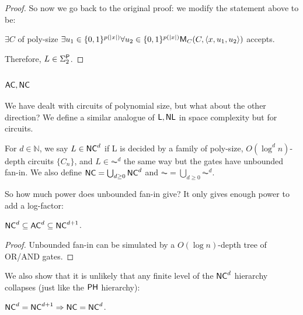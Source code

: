 \begin{proof}
\par So now we go back to the original proof: we modify the statement above to be:
\begin{center}
$\exists C$ of poly-size $\exists u_1 \in \{0, 1\}^{p(|x|)} \forall u_2 \in \{0, 1\}^{p(|x|)} \M_C(C, \langle x, u_1, u_2\rangle)$ accepts.
\end{center}
Therefore, $L \in \Sigma_2^\P$.
\end{proof}

\subsection{$\AC, \NC$}
We have dealt with circuits of polynomial size, but what about the other direction? We define a similar analogue of $\L, \NL$ in space complexity but for circuits.

\begin{definition}
For $d \in \mathbb{N}$, we say $L \in \NC^d$ if L is decided by a family of poly-size, $O(\log^d n)$-depth circuits $\{C_n\}$, and $L \in \AC^d$ the same way but the gates have unbounded fan-in. We also define $\NC = \bigcup_{d \ge 0}\NC^d$ and $\AC = \bigcup_{d \ge 0}\AC^d$.
\end{definition}
So how much power does unbounded fan-in give? It only gives enough power to add a log-factor:

\begin{theorem}
$\NC^d \subseteq \AC^d \subseteq \NC^{d+1}$.
\end{theorem}
\begin{proof}
Unbounded fan-in can be simulated by a $O(\log n)$-depth tree of OR/AND gates.
\end{proof}

We also show that it is unlikely that any finite level of the $\NC^d$ hierarchy collapses (just like the $\PH$ hierarchy):
\begin{theorem}
$\NC^d = \NC^{d+1} \Rightarrow \NC = \NC^d$.
\end{theorem}

